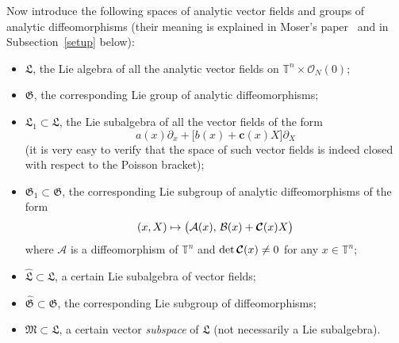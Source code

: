 \documentclass[12pt,reqno]{amsart}
\theoremstyle{definition}
\begin{document}
Now introduce the following spaces of analytic vector fields and groups of
analytic diffeomorphisms (their meaning is explained in Moser's
paper~\cite{M67} and in Subsection~\ref{setup} below):
\begin{itemize}
\item ${\mathfrak L}$, the Lie algebra of all the analytic vector fields on
${\mathbb T}^n\times{\mathcal O}_N(0)$;
\item ${\mathfrak G}$, the corresponding Lie group of analytic diffeomorphisms;
\item ${\mathfrak L}_1\subset{\mathfrak L}$, the Lie subalgebra of all the vector fields of the
form
\[
a(x)\partial_x+\bigl[b(x)+{\mathbf c}(x)X\bigr]\partial_X
\]
(it is very easy to verify that the space of such vector fields is indeed
closed with respect to the Poisson bracket);
\item ${\mathfrak G}_1\subset{\mathfrak G}$, the corresponding Lie subgroup of analytic
diffeomorphisms of the form
\[
(x,X)\mapsto\bigl({\mathcal A}(x), \, {\mathcal B}(x)+{\text{\boldmath $\mathcal C$}}(x)X\bigr)
\]
where ${\mathcal A}$ is a diffeomorphism of ${\mathbb T}^n$ and $\det{\text{\boldmath $\mathcal C$}}(x)\neq 0$ for any
$x\in{\mathbb T}^n$;
\item ${\widehat{\mathfrak L}}\subset{\mathfrak L}$, a certain Lie subalgebra of vector fields;
\item ${\widehat{\mathfrak G}}\subset{\mathfrak G}$, the corresponding Lie subgroup of diffeomorphisms;
\item ${\mathfrak M}\subset{\mathfrak L}$, a certain vector \emph{subspace} of ${\mathfrak L}$ (not
necessarily a Lie subalgebra).
\end{itemize}
\end{document}
